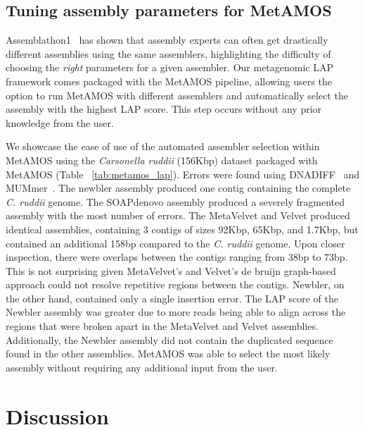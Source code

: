\subsection{Tuning assembly parameters for MetAMOS}
Assemblathon1~\cite{earl2011assemblathon} has shown that assembly experts can often get drastically different assemblies using the same assemblers, highlighting the difficulty of choosing the \emph{right} parameters for a given assembler.
Our metagenomic LAP framework comes packaged with the MetAMOS pipeline, allowing users the option to run MetAMOS with different assemblers and automatically select the assembly with the highest LAP score.
This step occurs without any prior knowledge from the user.

We showcase the ease of use of the automated assembler selection within MetAMOS using the \emph{Carsonella ruddii} (156Kbp) dataset packaged with MetAMOS (Table ~\ref{tab:metamos_lap}).
Errors were found using DNADIFF~\cite{phillippy2008genome} and MUMmer~\cite{delcher2003using}.
The newbler assembly produced one contig containing the complete \emph{C. ruddii} genome.
The SOAPdenovo assembly produced a severely fragmented assembly with the most number of errors.
The MetaVelvet and Velvet produced identical assemblies, containing 3 contigs of sizes 92Kbp, 65Kbp, and 1.7Kbp, but contained an additional 158bp compared to the \emph{C. ruddii} genome.
Upon closer inspection, there were overlaps between the contigs ranging from 38bp to 73bp.
This is not surprising given MetaVelvet's and Velvet's de bruijn graph-based approach could not resolve repetitive regions between the contigs.
Newbler, on the other hand, contained only a single insertion error.
The LAP score of the Newbler assembly was greater due to more reads being able to align across the regions that were broken apart in the MetaVelvet and Velvet assemblies.
Additionally, the Newbler assembly did not contain the duplicated sequence found in the other assemblies.
MetAMOS was able to select the most likely assembly without requiring any additional input from the user.

\section{Discussion}

